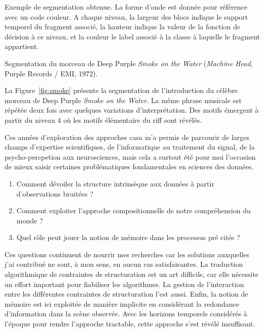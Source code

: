 \label{fig:alcéchantillon}

Exemple de segmentation obtenue. La forme d'onde est donnée pour référence avec un code couleur. A chaque niveau, la largeur des blocs indique le support temporel du fragment associé, la hauteur indique la valeur de la fonction de décision à ce niveau, et la couleur le label associé à la classe à laquelle le fragment appartient.

Segmentation du morceau de Deep Purple \emph{Smoke on the Water} (\emph{Machine Head}, Purple Records / EMI, 1972).

La Figure~\ref{fig:smoke} présente la segmentation de l'introduction du célèbre morceau de
Deep Purple \emph{Smoke on the Water}. La même phrase musicale est répétée deux fois avec quelques variations d'interprétation. Des motifs émergent à partir du niveau 4 où les motifs élémentaire du riff sont révélés.

Ces années d'exploration des approches casa m'a permis de parcourir de larges champs d'expertise scientifiques, de l'informatique au traitement du signal, de la psycho-percpetion aux neurosciences, mais cela a surtout été pour moi l'occasion de mieux saisir certaines problématiques fondamentales en sciences des données.
\begin{enumerate}
  \item Comment dévoiler la structure intrinsèque aux données à partir d'observations bruitées ?
  \item Comment exploiter l'approche compositionnelle de notre compréhension du monde ?
  \item Quel rôle peut jouer la notion de mémoire dans les processus pré cités ?
\end{enumerate}
Ces questions continuent de nourrir mes recherches car les solutions auxquelles j'ai contribué ne sont, à mon sens, en aucun cas satisfaisantes. La traduction algorithmique de contraintes de structuration est un art difficile, car elle nécessite un effort important pour fiabiliser les algorithmes. La gestion de l'interaction entre les différentes contraintes de structuration l'est aussi. Enfin, la notion de mémoire est ici exploitée de manière implicite en considérant la redondance d'information dans la scène observée. Avec les horizons temporels considérés à l'époque pour rendre l'approche tractable, cette approche s'est révélé insuffisant.  %

